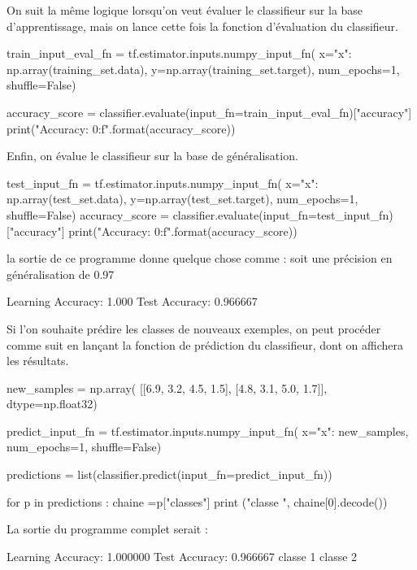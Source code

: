 \documentclass[a4paper,11pt]{book}
\theoremstyle{theo}
\begin{document}
On suit la même logique lorsqu'on veut évaluer le classifieur sur la base d'apprentissage, mais on lance cette fois la fonction d'évaluation du classifieur.
\begin{mypython}
train_input_eval_fn = tf.estimator.inputs.numpy_input_fn(
      x={"x": np.array(training_set.data)},
      y=np.array(training_set.target),
      num_epochs=1,
      shuffle=False)

  
accuracy_score = classifier.evaluate(input_fn=train_input_eval_fn)["accuracy"]
print("\nLearning Accuracy: {0:f}\n".format(accuracy_score))
\end{mypython}

Enfin, on évalue le classifieur sur la base de généralisation.
\begin{mypython}
test_input_fn = tf.estimator.inputs.numpy_input_fn(
      x={"x": np.array(test_set.data)},
      y=np.array(test_set.target),
      num_epochs=1,
      shuffle=False)
accuracy_score = classifier.evaluate(input_fn=test_input_fn)["accuracy"]
print("\nTest Accuracy: {0:f}\n".format(accuracy_score))
\end{mypython}

 
la sortie de ce programme donne quelque chose comme : soit une précision en généralisation de 0.97%
\begin{myoutput}
Learning Accuracy: 1.000
Test Accuracy: 0.966667
\end{myoutput}


Si l'on souhaite prédire les classes de nouveaux exemples, on peut procéder comme suit en lançant la fonction de prédiction du classifieur, dont on affichera les résultats.

\begin{mypython}
new_samples = np.array(
      [[6.9, 3.2, 4.5, 1.5],
       [4.8, 3.1, 5.0, 1.7]], dtype=np.float32)

predict_input_fn = tf.estimator.inputs.numpy_input_fn(
      x={"x": new_samples},
      num_epochs=1,
      shuffle=False)

predictions = list(classifier.predict(input_fn=predict_input_fn))
  
for p in predictions :
    chaine =p["classes"]
    print ("classe ", chaine[0].decode()) 

\end{mypython}

La sortie du programme complet serait :
\begin{myoutput}
Learning Accuracy: 1.000000
Test Accuracy: 0.966667
classe  1
classe  2
\end{myoutput}
\end{document}
